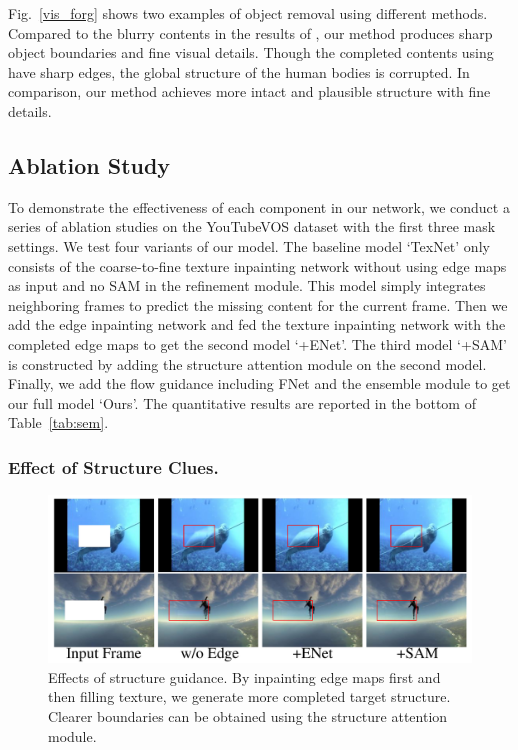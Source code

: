 Fig.~\ref{vis_forg} shows two examples of object removal using different methods. 
Compared to the blurry contents in the results of \cite{nazeri2019edgeconnect,wang2019video,Kim_2019_CVPR1}, our method produces sharp object boundaries and fine visual details. 
Though the completed contents using \cite{Xu_2019_CVPR} have sharp edges, the global structure of the human bodies is corrupted. In comparison, our method achieves more intact and plausible structure with fine details.


 


\subsection{Ablation Study}
To demonstrate the effectiveness of each component in our network, we conduct a series of ablation studies on the YouTubeVOS dataset with the first three mask settings. 
%
We test four variants of our model. 
The baseline model `TexNet' only consists of the coarse-to-fine texture inpainting network without using edge maps as input and no SAM in the refinement module.
This model simply integrates neighboring frames to predict the missing content for the current frame.
%
Then we add the edge inpainting network and fed the texture inpainting network with the completed edge maps to get the second model `+ENet'.
The third model `+SAM' is constructed by adding the structure attention module on the second model. 
Finally, we add the flow guidance including FNet and the ensemble module to get our full model `Ours'.
The quantitative results are reported in the bottom of Table~\ref{tab:sem}. 


\subsubsection{Effect of Structure Clues.}


\begin{figure}[!ht]
	\centering
	\includegraphics[width=0.97\columnwidth]{edgevis} %
	\caption{Effects of structure guidance. By inpainting edge maps first and then filling texture, we generate more completed target structure. Clearer boundaries can be obtained using the structure attention module.}
	\label{edgevis}
\end{figure}

